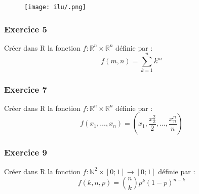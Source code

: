 \begin{figure}[H]\begin{center}\texttt{[image: ilu/.png]}\end{center}\end{figure}



\subsubsection{Exercice 5}
Créer dans R la fonction $f : \mathbb{R}^{n} \times \mathbb{R}^{n}$ définie par :
$$f(m,n)=\sum_{k=1}^{n} k^{m}$$



\subsubsection{Exercice 7}
Créer dans R la fonction $f : \mathbb{R}^{n} \times \mathbb{R}^{n}$ définie par :
$$f(x_{1},\dots,x_{n}) = \left(x_{1},\frac{x_{2}^{2}}{2},\dots,\frac{x_{n}^{n}}{n}\right)$$

\subsubsection{Exercice 9}
Créer dans R la fonction $f : \mathbb{N}^{2} \times [0;1] \rightarrow [0; 1]$ définie par :
$$f(k,n,p) = \binom{n}{k}p^{k}(1-p)^{n-k}$$